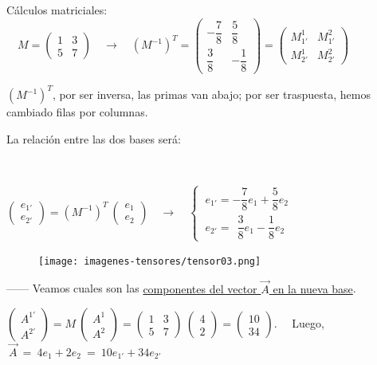 Cálculos matriciales: $\quad M=
\left( \begin{matrix} 1&3\\5&7 \end{matrix} \right)
\quad \to \quad 
{(M^{-1})}^T=
\left( \begin{matrix} -\dfrac 7 8& \dfrac 5 8 \\ \dfrac 3 8 & - \dfrac 1 8 \end{matrix} \right)=
\left( \begin{matrix} M_{1'}^{1} & M_{1'}^{2} \\ M_{2'}^{1} & M_{2'}^{2} \end{matrix} \right)$

\textcolor{gris}{${(M^{-1})}^T$, por ser inversa, las primas van abajo; por ser traspuesta, hemos cambiado filas por columnas.}

\begin{multicols}{2}
	
La relación entre las dos bases será:

$\quad$

$ \left( \begin{matrix} e_{1'} \\ e_{2'} \end{matrix} \right) =
{(M^{-1})}^T \ 
\left( \begin{matrix} e_{1} \\ e_{2} \end{matrix} \right) \quad \to \quad \begin{cases}
	\ e_{1'}=- \dfrac 7 8 e_1 + \dfrac 5 8 e_2 \\ 
	\ e_{2'}=  \ \ \dfrac 3 8 e_1 - \dfrac 1 8 e_2
\end{cases}$


	\begin{figure}[H]
		\centering
		\texttt{[image: imagenes-tensores/tensor03.png]}
	\end{figure}

\end{multicols}

------ Veamos cuales son las \underline{componentes del vector $\overrightarrow A$ en la nueva base}.

$\left( \begin{matrix} A^{1'} \\ A^{2'} \end{matrix} \right) =
M\ \left( \begin{matrix} A^{1} \\ A^{2} \end{matrix} \right)=
\left( \begin{matrix} 1&3\\5&7 \end{matrix} \right) \ 
\left( \begin{matrix} 4 \\ 2 \end{matrix} \right)=
\left( \begin{matrix}10 \\ 34 \end{matrix} \right). \quad$
Luego, $\ \overrightarrow A\ =\  4e_1+2e_2 \ = \ 10e_{1'}+34e_{2'}$

